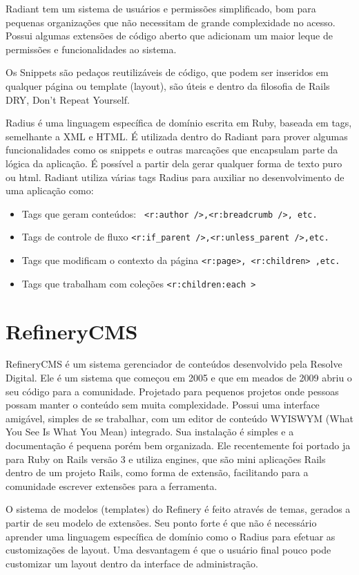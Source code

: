 Radiant tem um sistema de usuários e permissões simplificado, bom para pequenas organizações que não necessitam de grande complexidade no acesso. Possui algumas extensões de código aberto que adicionam um maior leque de permissões e funcionalidades ao sistema.

Os Snippets são pedaços reutilizáveis de código, que podem ser inseridos em qualquer página ou template (layout), são úteis e dentro da filosofia de Rails DRY, Don't Repeat Yourself. 

Radius é uma linguagem específica de domínio escrita em Ruby, baseada em tags, semelhante a XML e HTML. É utilizada dentro do Radiant para prover algumas funcionalidades como os snippets e outras marcações que encapsulam parte da lógica da aplicação. É possível a partir dela gerar qualquer forma de texto puro ou html. Radiant utiliza várias tags Radius para auxiliar no desenvolvimento de uma aplicação como:
\begin{itemize}
 \item Tags que geram conteúdos: \verb+ <r:author />,<r:breadcrumb />, etc.+
  \item Tags de controle de fluxo \verb+<r:if_parent />,<r:unless_parent />,etc.+
  \item Tags que modificam o contexto da página \verb+<r:page>, <r:children> ,etc.+
  \item Tags que trabalham com coleções \verb+<r:children:each >+
\end{itemize}


\section{RefineryCMS}

RefineryCMS é um sistema gerenciador de conteúdos desenvolvido pela Resolve Digital. Ele é um sistema que começou em 2005 e que em meados de 2009 abriu o seu código para a comunidade. Projetado para pequenos projetos onde pessoas possam manter o conteúdo sem muita complexidade. Possui uma interface amigável, simples de se trabalhar, com um editor de conteúdo WYISWYM (What You See Is What You Mean) integrado. Sua instalação é simples e a documentação é pequena porém bem organizada. Ele recentemente foi portado ja para  Ruby on Rails versão 3 e utiliza engines, que são mini aplicações Rails dentro de um projeto Rails, como forma de extensão, facilitando para a comunidade escrever extensões para a ferramenta. 

O sistema de modelos (templates) do Refinery é feito através de temas, gerados a partir de seu modelo de extensões. Seu ponto forte é que não é necessário aprender uma linguagem específica de domínio como o Radius para efetuar as customizações de layout. Uma desvantagem é que o usuário final pouco pode customizar um layout dentro da interface de administração.

